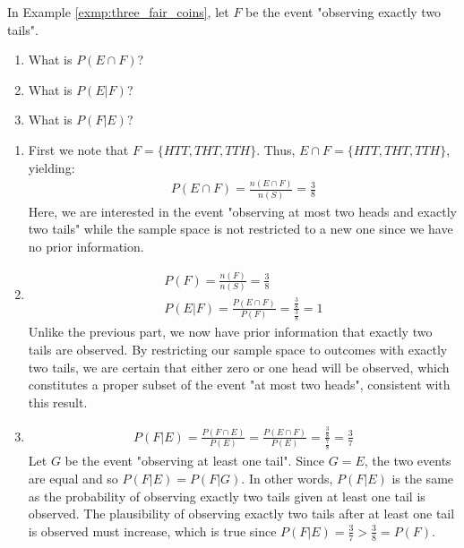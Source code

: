 \begin{exmp}
	In Example \autoref{exmp:three_fair_coins}, let \( F \) be the event "observing exactly two tails".
	\begin{enumerate}
		\item What is \( P(E \cap F) \)?
		\item What is \( P(E | F) \)?
		\item What is \( P(F | E) \)?
	\end{enumerate}
\end{exmp}
\begin{solution}
	\begin{enumerate}
		\item First we note that \( F = \{ HTT, THT, TTH \} \).
		Thus, \( E \cap F = \{ HTT, THT, TTH \} \), yielding:
		\begin{align*}
			P(E \cap F) = \frac{n(E \cap F)}{n(S)} = \frac{3}{8}
		\end{align*}
		Here, we are interested in the event "observing at most two heads and exactly two tails" while the sample space is not restricted to a new one since we have no prior information.
		\item \begin{gather*}
			P(F) = \frac{n(F)}{n(S)} = \frac{3}{8}\\
			P(E | F) = \frac{P(E \cap F)}{P(F)} = \frac{\frac{3}{8}}{\frac{3}{8}} = 1
		\end{gather*}
		Unlike the previous part, we now have prior information that exactly two tails are observed. 
		By restricting our sample space to outcomes with exactly two tails, we are certain that either zero or one head will be observed, which constitutes a proper subset of the event "at most two heads", consistent with this result.
		\item \begin{gather*}
			P(F | E) = \frac{P(F \cap E)}{P(E)} = \frac{P(E \cap F)}{P(E)} = \frac{\frac{3}{8}}{\frac{7}{8}} = \frac{3}{7}
		\end{gather*}
		Let \( G \) be the event "observing at least one tail".
		Since \( G = E \), the two events are equal and so \( P(F | E) = P(F | G) \).
		In other words, \( P(F | E) \) is the same as the probability of observing exactly two tails given at least one tail is observed.
		The plausibility of observing exactly two tails after at least one tail is observed must increase,
		which is true since \( P(F | E) = \frac{3}{7} > \frac{3}{8} = P(F) \).
	\end{enumerate}
\end{solution}

